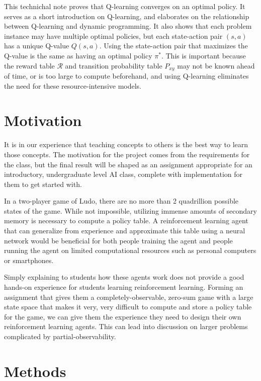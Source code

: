 \documentclass[conference]{IEEEtran}
\begin{document}
This technichal note proves that Q-learning converges on an optimal policy.
It serves as a short introduction on Q-learning, and elaborates on the
relationship between Q-learning and dynamic programming. It also shows that
each problem instance may have multiple optimal policies, but each
state-action pair $(s, a)$ has a unique Q-value $Q(s, a)$. Using the
state-action pair that maximizes the Q-value is the same as having an optimal
policy $\pi^*$. This is important because the reward table $\mathcal{R}$ and
transition probability table $P_{xy}$ may not be known ahead of time, or is
too large to compute beforehand, and using Q-learning eliminates the need for
these resource-intensive models.

\section{Motivation}

It is in our experience that teaching concepts to others is the best way to
learn those concepts. The motivation for the project comes from the
requirements for the class, but the final result will be shaped as an
assignment appropriate for an introductory, undergraduate level AI class,
complete with implementation for them to get started with.

In a two-player game of Ludo, there are no more than 2 quadrillion possible
states of the game. While not impossible, utilizing immense amounts of
secondary memory is necessary to compute a policy table. A reinforcement
learning agent that can generalize from experience and approximate this table
using a neural network would be beneficial for both people training the agent
and people running the agent on limited computational resources such as
personal computers or smartphones. 

Simply explaining to students how these agents work does not provide a good
hands-on experience for students learning reinforcement learning. Forming an
assignment that gives them a completely-observable, zero-sum game with a large
state space that makes it very, very difficult to compute and store a policy
table for the game, we can give them the experience they need to design their
own reinforcement learning agents. This can lead into discussion on larger
problems complicated by partial-observability.

\section{Methods}
\end{document}
